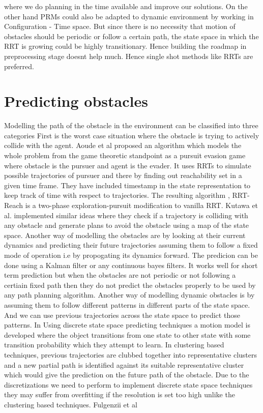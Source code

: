 \documentclass[MTech]{iitmdiss}
\begin{document}
\cite{dyna92}
where we do planning in the time available and improve our solutions. 
On the other hand PRMs could also be adapted to dynamic environment by working in Configuration - Time space. But since there is no necessity that motion of obstacles should be periodic or follow a certain path, the state space in which the RRT is growing could be highly transitionary. Hence building the roadmap in preprocessing stage doesnt help much. Hence single shot methods like RRTs are preferred. 



 
\section{Predicting obstacles} 

Modelling the path of the obstacle in the environment can be classified into three categories
\cite{aoude13}
First is the worst case situation where the obstacle is trying to actively collide with the agent. Aoude et al 
\cite{aoude10}
proposed an algorithm which models the whole problem from the game theoretic standpoint as a pursuit evasion game where obstacle is the pursuer and agent is the evader. It uses RRTs to simulate possible trajectories of pursuer and there by finding out reachability set in a given time frame. They have included timestamp in the state representation to keep track of time with respect to trajectories. The resulting algorithm , RRT-Reach is a two-phase exploration-pursuit modification to vanilla RRT. Kutawa et al. 
\cite{kutawa08}
 implemented similar ideas where they check if a trajectory is colliding with any obstacle and generate plans to avoid the obstacle using a map of the state space. Another way of modelling the obstacles are by looking at their current dynamics and predicting their future trajectories assuming them to follow a fixed mode of operation i.e by propogating its dynamics forward. The predicion can be done using a Kalman filter or any continuous bayes filters. It works well for short term prediction but when the obstacles are not periodic or not following a certiain fixed path then they do not predict the obstacles properly to be used by any path planning algorithm. Another way of modelling dynamic obstacles is by assuming them to follow different patterns in different parts of the state space. And we can use previous trajectories across the state space to predict those patterns. In 
\cite{aoude13}
  Using discrete state space predicting techniques a motion model is developed where the object transitions from one state to other state with some transition probability which they attempt to learn. In clustering based techniques, previous trajectories are clubbed together into representative clusters and a new partial path is identified against its suitable representative cluster which would give the prediction on the future path of the obstacle. Due to the discretizations we need to perform to implement discrete state space techniques they may suffer from overfitting if the resolution is set too high unlike the clustering based techniques. Fulgenzii et al 
\end{document}

